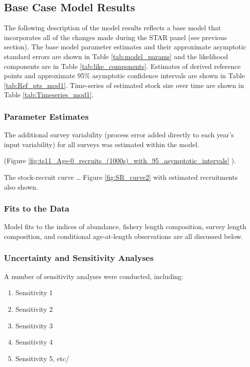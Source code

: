 \documentclass[12pt,]{article}
\begin{document}
\subsection{Base Case Model Results}\label{base-case-model-results}

The following description of the model results reflects a base model
that incorporates all of the changes made during the STAR panel (see
previous section). The base model parameter estimates and their
approximate asymptotic standard errors are shown in Table
\ref{tab:model_params} and the likelihood components are in Table
\ref{tab:like_components}. Estimates of derived reference points and
approximate 95\% asymptotic confidence intervals are shown in Table
\ref{tab:Ref_pts_mod1}. Time-series of estimated stock size over time
are shown in Table \ref{tab:Timeseries_mod1}.

\subsubsection{Parameter Estimates}\label{parameter-estimates}

The additional survey variability (process error added directly to each
year's input variability) for all surveys was estimated within the
model.

(Figure
\ref{fig:ts11_Age-0_recruits_(1000s)_with_95_asymptotic_intervals} ).

The stock-recruit curve \ldots{} Figure \ref{fig:SR_curve2} with
estimated recruitments also shown.

\subsubsection{Fits to the Data}\label{fits-to-the-data}

Model fits to the indices of abundance, fishery length composition,
survey length composition, and conditional age-at-length observations
are all discussed below.

\subsubsection{Uncertainty and Sensitivity
Analyses}\label{uncertainty-and-sensitivity-analyses}

A number of sensitivity analyses were conducted, including:

\begin{enumerate}

  \item Sensitivity 1
  
  \item Sensitivity 2
  
  \item Sensitivity 3
  
  \item Sensitivity 4
  
  \item Sensitivity 5, etc/
  
  
\end{enumerate}
\end{document}
